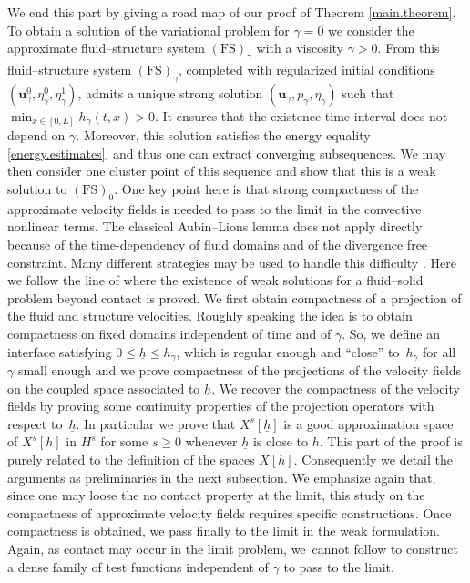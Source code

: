 \documentclass[JEP,XML,SOM,Unicode,NoFloatCountersInSection]{cedram}
\newcommand{\FS}{\mathrm{FS}}
\theoremstyle{remark}
\theoremstyle{definition}
\newcommand{\ug}{\boldsymbol{u}}
\begin{document}
We end this part by giving a road map of our proof of Theorem \ref{main.theorem}.
To obtain a solution of the variational problem for $\gamma=0$ we consider the approximate fluid--structure system $(\FS)_{\gamma}$ with a viscosity $\gamma>0$. From \cite[Th.\,1]{Grandmont-Hillairet-Lequeurre} this fluid--structure system $(\FS)_{\gamma}$, completed with regularized initial conditions $(\ug^{0}_{\gamma},\eta^{0}_{\gamma},\eta^{1}_{\gamma})$, admits a unique strong solution $(\ug_{\gamma},p_{\gamma},\eta_{\gamma})$ such that $\min_{x\in [0, L]}h_\gamma(t, x)>0$. It ensures that the existence time interval does not depend on $\gamma$. Moreover, this solution satisfies the energy equality \eqref{energy.estimates}, and thus one can extract converging subsequences. 
We may then consider one cluster point of this sequence and show that this is a weak solution to $(\FS)_0$.
One key point here is that strong compactness of the approximate velocity fields is needed to pass to the limit in the convective nonlinear terms. The classical Aubin--Lions lemma does not apply directly because of the time-dependency of fluid domains and of the divergence free constraint. Many different strategies may be used to handle this difficulty \cite{Fujita-Sauer, Grandmont08, Lengeler, Moussa}. Here we follow the line of \cite{SanMartin-Starovoitov-Tucsnak} where the existence of weak solutions for a fluid--solid problem beyond contact is proved. We first obtain compactness of a projection of the fluid and structure velocities. Roughly speaking the idea is to obtain compactness on fixed domains independent of time and of $\gamma$. So, we define an interface satisfying $0\leq\underline{h}\leq h_\gamma$, which is regular enough and ``close'' to~$h_\gamma$ for all $\gamma$ small enough
and we prove compactness of the projections of the velocity fields on the coupled space associated to $\underline{h}$. We recover the
compactness of the velocity fields by proving some continuity properties of the projection operators with respect to~$\underline{h}$. {In particular we prove that $X^{s}[\underline{h}]$ is a good approximation space of $X^{s}[h]$ in $H^s$ for some $s\geq 0$ whenever $\underline{h}$ is close to $h$.}
This part of the proof is purely related to the definition of the spaces $X[h]$. Consequently we detail the arguments as preliminaries in the next subsection. We emphasize again that, since one may loose the no contact property at the limit, this study on the compactness of approximate velocity fields requires specific constructions. Once compactness is obtained, we pass finally to the limit in the weak formulation. Again, as contact may occur in the limit problem, we~cannot follow \cite{Chambolle-etal} to construct a dense family of test functions independent of $\gamma$ to pass to the limit.
\end{document}
